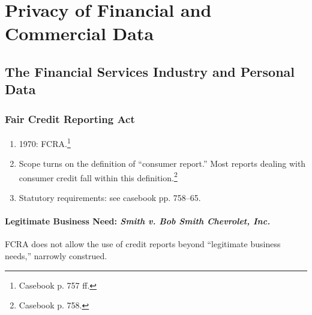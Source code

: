 \section{Privacy of Financial and Commercial Data}

\subsection{The Financial Services Industry and Personal Data}

\subsubsection{Fair Credit Reporting Act}

\begin{enumerate}
    \item 1970: FCRA.\footnote{Casebook p. 757 ff.}
    \item Scope turns on the definition of ``consumer report.'' Most reports 
    dealing with consumer credit fall within this definition.\footnote{Casebook 
    p. 758.}
    \item Statutory requirements: see casebook pp. 758--65.
\end{enumerate}

\paragraph{Legitimate Business Need: \emph{Smith v. Bob Smith Chevrolet, Inc.}}

FCRA does not allow the use of credit reports beyond ``legitimate business 
needs,'' narrowly construed.

